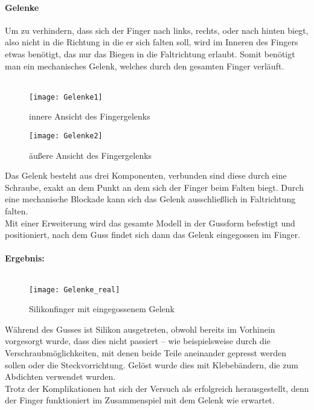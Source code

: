 \documentclass[titlepage,12pt,twoside]{article}
\begin{document}
\paragraph{Gelenke}
\hfill \break
\hfill \break
Um zu verhindern, dass sich der Finger nach links, rechts, oder nach hinten biegt, also nicht in die Richtung in die er sich falten soll, wird im Inneren des Fingers etwas benötigt, das nur das Biegen in die Faltrichtung erlaubt. Somit benötigt man ein 
mechanisches Gelenk, welches durch den gesamten Finger verläuft. \\
\\
\begin{figure}[H]
	\begin{center}
		\scalebox{0.8}
		{\texttt{[image: Gelenke1]}}
		\caption{innere Ansicht des Fingergelenks}
		\label{fig:Gelenke1}			
	\end{center}
\end{figure}
\begin{figure}[H]
	\begin{center}
		\scalebox{0.8}
		{\texttt{[image: Gelenke2]}}
		\caption{äußere Ansicht des Fingergelenks}
		\label{fig:Gelenke2}			
	\end{center}
\end{figure}
\hfill \break
Das Gelenk besteht aus drei Komponenten, verbunden sind diese durch eine Schraube, exakt an dem Punkt an dem sich der Finger beim Falten biegt. Durch eine mechanische Blockade kann sich das Gelenk ausschließlich in Faltrichtung falten. \\
Mit einer Erweiterung wird das gesamte Modell in der Gussform befestigt und positioniert, nach dem Guss findet sich dann das Gelenk eingegossen im Finger. \\
\\
\textbf{Ergebnis:} \\
\\
\begin{figure}[H]
	\begin{center}
		\scalebox{0.8}
		{\texttt{[image: Gelenke\_real]}}
		\caption{Silikonfinger mit eingegossenem Gelenk}
		\label{fig:Gelenke_real}			
	\end{center}
\end{figure}
\hfill \break
Während des Gusses ist Silikon ausgetreten, obwohl bereits im Vorhinein vorgesorgt wurde, dass dies nicht passiert – wie beispielsweise durch die Verschraubmöglichkeiten, mit denen beide Teile aneinander gepresst werden sollen oder die Steckvorrichtung. 
Gelöst wurde dies mit Klebebändern, die zum Abdichten verwendet wurden. \\
Trotz der Komplikationen hat sich der Versuch als erfolgreich herausgestellt, denn der Finger funktioniert im Zusammenspiel mit dem Gelenk wie erwartet. \\
\end{document}
